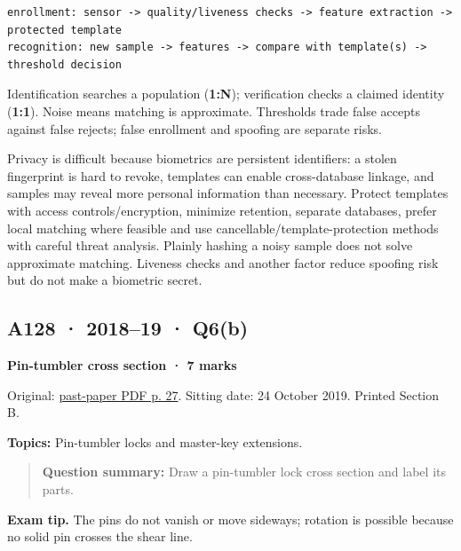\documentclass[11pt,a4paper]{article}
\begin{document}
\begin{Verbatim}[breaklines=true,breakanywhere=true,fontsize=\small,frame=single,rulecolor=\color{PanelBorder}]
enrollment: sensor -> quality/liveness checks -> feature extraction -> protected template
recognition: new sample -> features -> compare with template(s) -> threshold decision
\end{Verbatim}

Identification searches a population (\textbf{1:N}); verification checks a claimed identity (\textbf{1:1}). Noise means matching is approximate. Thresholds trade false accepts against false rejects; false enrollment and spoofing are separate risks.


Privacy is difficult because biometrics are persistent identifiers: a stolen fingerprint is hard to revoke,\allowbreak{} templates can enable cross-database linkage,\allowbreak{} and samples may reveal more personal information than necessary. Protect templates with access controls/\allowbreak{}encryption,\allowbreak{} minimize retention,\allowbreak{} separate databases,\allowbreak{} prefer local matching where feasible and use cancellable/\allowbreak{}template-protection methods with careful threat analysis. Plainly hashing a noisy sample does not solve approximate matching. Liveness checks and another factor reduce spoofing risk but do not make a biometric secret.




\clearpage
\subsection{A128 · 2018–19 · Q6(b)}\label{a128}

\textbf{Pin-tumbler cross section · 7 marks}


Original: \href{../../CSE405-Security_Merged.pdf\#page=27}{past-paper PDF p. 27}. Sitting date: 24 October 2019. Printed Section B.


\textbf{Topics:} Pin-tumbler locks and master-key extensions.



\begin{quote}\small

\textbf{Question summary:} Draw a pin-tumbler lock cross section and label its parts.



\end{quote}


{\color{ForestGreen}\textbf{Exam tip.} The pins do not vanish or move sideways; rotation is possible because no solid pin crosses the shear line.}
\end{document}

